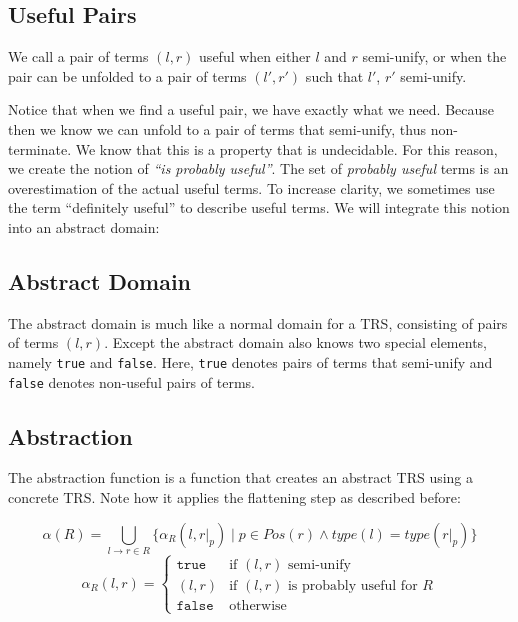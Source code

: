 \subsection*{Useful Pairs}
\begin{definition}
We call a pair of terms $(l, r)$ useful when either $l$ and $r$ semi-unify, or when the pair can be unfolded to a pair of terms $(l', r')$ such that $l'$, $r'$ semi-unify.
\end{definition}
Notice that when we find a useful pair, we have exactly what we need. Because then we know we can unfold to a pair of terms that semi-unify, thus non-terminate. We know that this is a property that is undecidable. For this reason, we create the notion of \textit{``is probably useful''}. The set of \textit{probably useful} terms is an overestimation of the actual useful terms. To increase clarity, we sometimes use the term ``definitely useful'' to describe useful terms. We will integrate this notion into an abstract domain:

\subsection*{Abstract Domain}
The abstract domain is much like a normal domain for a TRS, consisting of pairs of terms $(l, r)$. Except the abstract domain also knows two special elements, namely \texttt{true} and \texttt{false}. Here, \texttt{true} denotes pairs of terms that semi-unify and \texttt{false} denotes non-useful pairs of terms.

\subsection*{Abstraction}
The abstraction function is a function that creates an abstract TRS using a concrete TRS. Note how it applies the flattening step as described before: \begin{definition}
\label{def:abstraction}
\[
\alpha(R) = \bigcup\limits_{l \rightarrow r \in R} \{\alpha_R(l, \left.r\right|_p) \mid p \in \textit{Pos}(r) \land \textit{type}(l) = \textit{type}(\left.r\right|_p)\} 
\]
\[
\alpha_R(l, r) =
\left\{
    \begin{array}{ll}
        \texttt{true} & \text{if } (l, r) \text{ semi-unify}\\
        (l, r) & \text{if } (l, r) \text{ is probably useful for } R\\
        \texttt{false} & \text{otherwise}
    \end{array}
\right.
\]
\end{definition}

